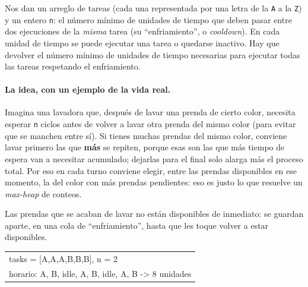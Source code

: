
Nos dan un arreglo de tareas (cada una representada por una letra de la
\texttt{A} a la \texttt{Z}) y un entero \texttt{n}: el número mínimo de
unidades de tiempo que deben pasar entre dos ejecuciones de la
\emph{misma} tarea (su ``enfriamiento'', o \emph{cooldown}). En cada unidad
de tiempo se puede ejecutar una tarea o quedarse inactivo. Hay que devolver
el número mínimo de unidades de tiempo necesarias para ejecutar todas las
tareas respetando el enfriamiento.

\paragraph{La idea, con un ejemplo de la vida real.} Imagina una lavadora
que, después de lavar una prenda de cierto color, necesita esperar
\texttt{n} ciclos antes de volver a lavar otra prenda del mismo color (para
evitar que se manchen entre sí). Si tienes muchas prendas del mismo color,
conviene lavar primero las que \textbf{más} se repiten, porque esas son las
que más tiempo de espera van a necesitar acumulado; dejarlas para el final
solo alarga más el proceso total. Por eso en cada turno conviene elegir,
entre las prendas disponibles en ese momento, la del color con más prendas
pendientes: eso es justo lo que resuelve un \emph{max-heap} de conteos.

Las prendas que se acaban de lavar no están disponibles de inmediato: se
guardan aparte, en una cola de ``enfriamiento'', hasta que les toque volver
a estar disponibles.

\begin{center}
\ttfamily
\begin{tabular}{l}
tasks = [A,A,A,B,B,B], n = 2\\
horario: A, B, idle, A, B, idle, A, B -> 8 unidades\\
\end{tabular}
\end{center}

